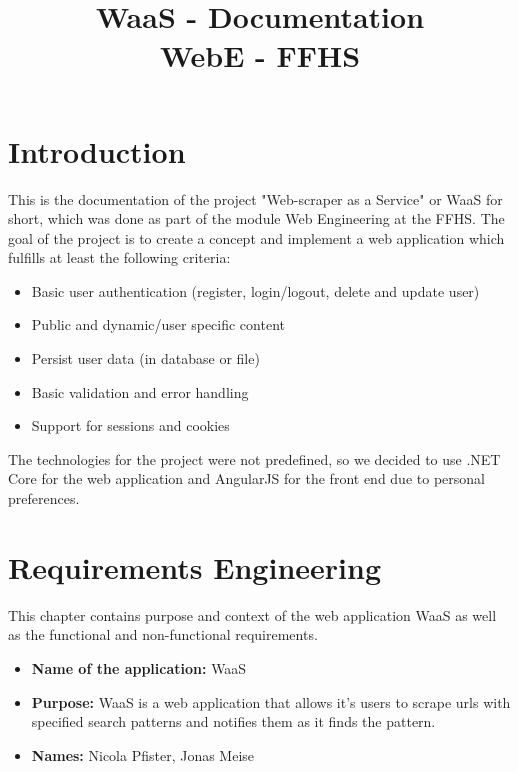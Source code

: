 \documentclass[titlepage, 12pt]{article}
\author{\authorName}
\title{WaaS - Documentation \\ \medskip \large WebE - FFHS}
\begin{document}
\maketitle

\pagebreak

\renewcommand{\contentsname}{Table of Contents}

\tableofcontents

\pagebreak

\section{Introduction}

This is the documentation of the project "Web-scraper as a Service" or WaaS for short, which was done as part of the module Web Engineering at the FFHS. The goal of the project is to create a concept and implement a web application which fulfills at least the following criteria:

\begin{itemize}
  \item Basic user authentication (register, login/logout, delete and update user)
  \item Public and dynamic/user specific content
  \item Persist user data (in database or file)
  \item Basic validation and error handling
  \item Support for sessions and cookies
\end{itemize}

The technologies for the project were not predefined, so we decided to use .NET Core for the web application and AngularJS for the front end due to personal preferences.

\pagebreak

\section{Requirements Engineering\label{sectionRequirementsEngineering}}

This chapter contains purpose and context of the web application WaaS as well as the functional and non-functional requirements.

\begin{itemize}
  \item \textbf{Name of the application:} WaaS
  \item \textbf{Purpose:} WaaS is a web application that allows it's users to scrape urls with specified search patterns and notifies them as it finds the pattern.
  \item \textbf{Names:} Nicola Pfister, Jonas Meise
\end{itemize}
\end{document}
